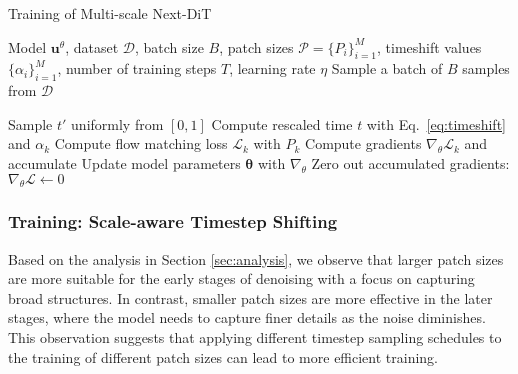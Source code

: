 \begin{algorithm}[t]
   \caption{Training of Multi-scale Next-DiT}
   \label{alg:train}
    \begin{algorithmic}
        Model $\mathbf{u}^\theta$, dataset $\mathcal{D}$, batch size $B$, patch sizes $\mathcal{P}=\{P_i\}_{i=1}^M$, timeshift values $\{\alpha_i\}_{i=1}^M$, number of training steps $T$, learning rate $\eta$
               \STATE Sample a batch of $B$ samples from $\mathcal{D}$
               
               \STATE Sample $t'$ uniformly from $[0,1]$
               \STATE Compute rescaled time $t$ with Eq.~\ref{eq:timeshift} and $\alpha_{k}$
               \STATE Compute flow matching loss $\mathcal{L}_k$ with $P_k$
               \STATE Compute gradients $\nabla_{\theta} \mathcal{L}_k$ and accumulate
           \ENDFOR
           \STATE Update model parameters $\mathbf{\theta}$ with $\nabla_{\theta}$
           \STATE Zero out accumulated gradients: $\nabla_{\theta} \mathcal{L} \gets 0$
       \ENDFOR
    \end{algorithmic}
\end{algorithm}

\subsubsection{Training: Scale-aware Timestep Shifting}
\label{sec:scle-aware-ts}
Based on the analysis in Section \ref{sec:analysis}, we observe that larger patch sizes are more suitable for the early stages of denoising with a focus on capturing broad structures. In contrast, smaller patch sizes are more effective in the later stages, where the model needs to capture finer details as the noise diminishes. This observation suggests that applying different timestep sampling schedules to the training of different patch sizes can lead to more efficient training. 

